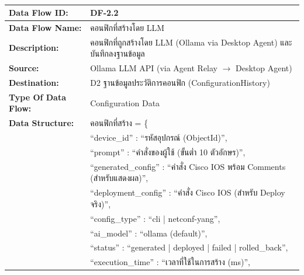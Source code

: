 \begin{table}[H]
    \caption{}
    \label{tab:df-2-2}
    \fontSixTeen 
    \begin{tabularx}{\textwidth}{|l|L|} 
        \hline
        \textbf{Data Flow ID:} & DF-2.2 \\
        \hline
        \textbf{Data Flow Name:} & คอนฟิกที่สร้างโดย LLM \\
        \hline
        \textbf{Description:} & คอนฟิกที่ถูกสร้างโดย LLM (Ollama via Desktop Agent) และบันทึกลงฐานข้อมูล \\
        \hline
        \textbf{Source:} & Ollama LLM API (via Agent Relay $\rightarrow$ Desktop Agent) \\
        \hline
        \textbf{Destination:} & D2 ฐานข้อมูลประวัติการคอนฟิก (ConfigurationHistory) \\
        \hline
        \textbf{Type Of Data Flow:} & Configuration Data \\
        \hline
        \textbf{Data Structure:} & คอนฟิกที่สร้าง = \{ \nonumber \\
                        & \hspace{1em} ``device\_id'' : ``รหัสอุปกรณ์ (ObjectId)'', \nonumber \\
                        & \hspace{1em} ``prompt'' : ``คำสั่งของผู้ใช้ (ขั้นต่ำ 10 ตัวอักษร)'', \nonumber \\
                        & \hspace{1em} ``generated\_config'' : ``คำสั่ง Cisco IOS พร้อม Comments (สำหรับแสดงผล)'', \nonumber \\
                        & \hspace{1em} ``deployment\_config'' : ``คำสั่ง Cisco IOS (สำหรับ Deploy จริง)'', \nonumber \\
                        & \hspace{1em} ``config\_type'' : ``cli | netconf-yang'', \nonumber \\
                        & \hspace{1em} ``ai\_model'' : ``ollama (default)'', \nonumber \\
                        & \hspace{1em} ``status'' : ``generated | deployed | failed | rolled\_back'', \nonumber \\
                        & \hspace{1em} ``execution\_time'' : ``เวลาที่ใช้ในการสร้าง (ms)'', \nonumber \\

\end{tabularx}
\end{table}
